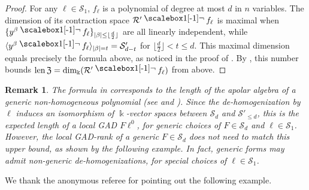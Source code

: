 \documentclass{amsart}
\theoremstyle{plain}
\newtheorem{remark}[remark]{Remark}
\renewcommand{\k}{\Bbbk}
\renewcommand{\S}{\mathcal{S}}
\newcommand{\len}{\textnormal{len}\,}
\def\b{\beta}
\newcommand{\contract}{\mathbin{\mathpalette\dointprod\relax}}
\newcommand{\dointprod}[2]{%
  \raisebox{\depth}{\scalebox{1}[-1]{$#1\lnot$}}}
\def\R{\mathcal{R}}
\def\Z{\mathfrak{Z}}
\numberwithin{equation}{section}
\begin{document}
\begin{proof}
    For any $\ell \in \S_1$, $f_\ell$ is a polynomial of degree at most $d$ in $n$ variables.
    The dimension of its contraction space $\R' \contract f_\ell$ is maximal when
    $\{ y^{\b} \contract f_\ell \}_{|\b| \leq \lfloor \frac{d}{2} \rfloor}$ are all linearly independent, while $\langle y^{\b} \contract f_\ell \rangle_{|\b| = t} = \S_{d-t}'$ for $\lfloor \frac{d}{2} \rfloor < t \leq d$.
    This maximal dimension equals precisely the formula above, as noticed in the proof of \cite[Thm. 3]{BR13}.
    By , this number bounds $\len \Z = \dim_{\k}(\R' \contract f_\ell)$ from above.
\end{proof}

\begin{remark}
The formula in  corresponds to the length of the apolar algebra of a generic non-homogeneous polynomial (see \cite[Thm. 3.31]{IE78} and \cite[Thm. 1D]{Iar84}).
Since the de-homogenization by $\ell$ induces an isomorphism of $\k$-vector spaces between $\S_d$ and $\S'_{\leq d}$, this is the expected length of a local GAD $F\ell^0$, for generic choices of $F \in \S_d$ and $\ell \in \S_1$.
However, the local GAD-rank of a generic $F \in \S_d$ does not need to match this upper bound, as shown by the following example.
In fact, generic forms may admit non-generic de-homogenizations, for special choices of $\ell \in \S_1$.
\end{remark}

We thank the anonymous referee for pointing out the following example.
\end{document}
